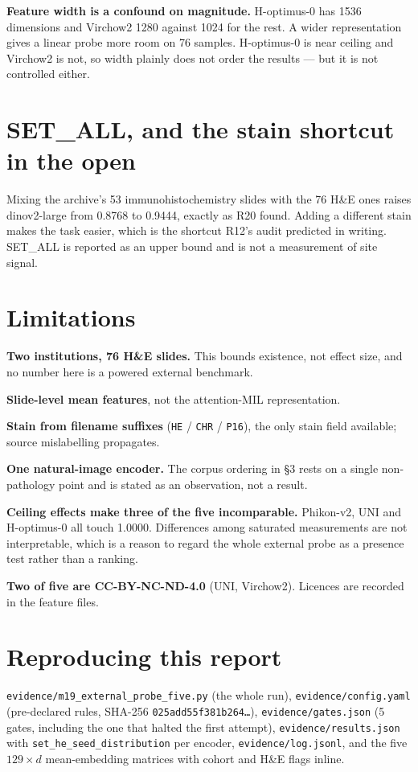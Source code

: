 \documentclass[11pt,a4paper]{article}
\begin{document}
\textbf{Feature width is a confound on magnitude.} H-optimus-0 has 1536 dimensions and Virchow2
1280 against 1024 for the rest. A wider representation gives a linear probe more room on 76
samples. H-optimus-0 is near ceiling and Virchow2 is not, so width plainly does not order the
results --- but it is not controlled either.

\section{SET\_ALL, and the stain shortcut in the open}

Mixing the archive's 53 immunohistochemistry slides with the 76 H\&E ones raises dinov2-large from
0.8768 to 0.9444, exactly as R20 found. Adding a different stain makes the task easier, which is
the shortcut R12's audit predicted in writing. SET\_ALL is reported as an upper bound and is not a
measurement of site signal.

\section{Limitations}

\textbf{Two institutions, 76 H\&E slides.} This bounds existence, not effect size, and no number
here is a powered external benchmark.

\textbf{Slide-level mean features}, not the attention-MIL representation.

\textbf{Stain from filename suffixes} (\texttt{HE} / \texttt{CHR} / \texttt{P16}), the only stain
field available; source mislabelling propagates.

\textbf{One natural-image encoder.} The corpus ordering in \S3 rests on a single non-pathology
point and is stated as an observation, not a result.

\textbf{Ceiling effects make three of the five incomparable.} Phikon-v2, UNI and H-optimus-0 all
touch 1.0000. Differences among saturated measurements are not interpretable, which is a reason to
regard the whole external probe as a presence test rather than a ranking.

\textbf{Two of five are CC-BY-NC-ND-4.0} (UNI, Virchow2). Licences are recorded in the feature
files.

\section*{Reproducing this report}

\texttt{evidence/m19\_external\_probe\_five.py} (the whole run),
\texttt{evidence/config.yaml} (pre-declared rules, SHA-256
\texttt{025add55f381b264\ldots}), \texttt{evidence/gates.json} (5 gates, including the one that
halted the first attempt), \texttt{evidence/results.json} with
\texttt{set\_he\_seed\_distribution} per encoder, \texttt{evidence/log.jsonl}, and the five
$129 \times d$ mean-embedding matrices with cohort and H\&E flags inline.
\end{document}
